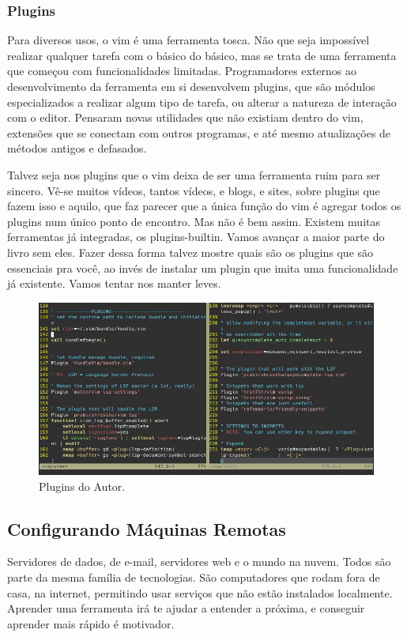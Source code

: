 \subsubsection{Plugins}
Para diversos usos, o vim é uma ferramenta tosca.
Não que seja impossível realizar qualquer tarefa com o básico do básico,
mas se trata de uma ferramenta que começou com funcionalidades limitadas.
Programadores externos ao desenvolvimento da ferramenta em si desenvolvem plugins,
que são módulos especializados a realizar algum tipo de tarefa, ou alterar a natureza
de interação com o editor.
Pensaram novas utilidades que não existiam dentro do vim, extensões que se conectam com outros programas,
e até mesmo atualizações de métodos antigos e defasados.

Talvez seja nos plugins que o vim deixa de ser uma ferramenta ruim para ser sincero.
Vê-se muitos vídeos, tantos vídeos, e blogs, e sites, sobre plugins que fazem isso e aquilo,
que faz parecer que a única função do vim é agregar todos os plugins num único ponto de encontro.
Mas não é bem assim.
Existem muitas ferramentas já integradas, os plugins-builtin.
Vamos avançar a maior parte do livro sem eles.
Fazer dessa forma talvez mostre quais são os plugins que são essenciais pra você,
ao invés de instalar um plugin que imita uma funcionalidade já existente.
Vamos tentar nos manter leves.

\begin{figure}[!ht]
\centering
\includegraphics[scale=0.73]{motivacao/Plugin_Exemplo.jpg}
\caption{Plugins do Autor.}
\end{figure}

\subsection{Configurando Máquinas Remotas}
Servidores de dados, de e-mail, servidores web e o mundo na nuvem.
Todos são parte da mesma família de tecnologias.
São computadores que rodam fora de casa, na internet, permitindo usar serviços que não estão instalados localmente.
Aprender uma ferramenta irá te ajudar a entender a próxima, e conseguir aprender mais rápido é motivador.

